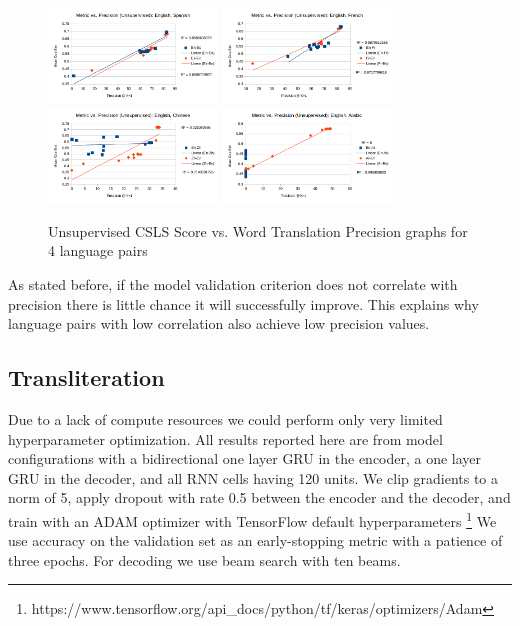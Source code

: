 \documentclass{article}
\begin{document}
\begin{figure}[H]
  \centering
  \includegraphics[width=0.4\textwidth]{spanishCorr}
  \includegraphics[width=0.4\textwidth]{frenchCorr}
  \includegraphics[width=0.4\textwidth]{chineseCorr}
  \includegraphics[width=0.4\textwidth]{arabicCorr}
  \caption{Unsupervised CSLS Score vs. Word Translation Precision graphs for 4 language pairs}
\end{figure}

As stated before, if the model validation criterion does not correlate with
precision there is little chance it will successfully improve. This
explains why language pairs with low correlation also achieve low precision values.

\subsection*{Transliteration}

Due to a lack of compute resources we could perform
only very limited hyperparameter optimization.
All results reported here are from model configurations
with a bidirectional one layer GRU in the encoder,
a one layer GRU in the decoder,
and all RNN cells having 120 units.
We clip gradients to a norm of 5,
apply dropout with rate 0.5 between the encoder and the decoder,
and train with an ADAM optimizer with TensorFlow default hyperparameters
\footnote{https://www.tensorflow.org/api\_docs/python/tf/keras/optimizers/Adam}
We use accuracy on the validation set as an early-stopping metric
with a patience of three epochs.
For decoding we use beam search with ten beams.
\end{document}
